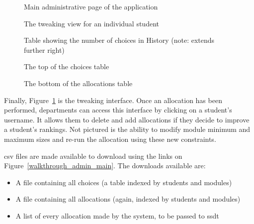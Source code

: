\begin{landscape}
  \begin{figure}
    \begin{minipage}{0.5\linewidth}
      \centering
      \caption{Main administrative page of the application}
      \label{walkthrough_admin_main}
    \end{minipage}
    \hspace{0.5cm}
    \begin{minipage}{0.5\linewidth}
      \centering
      \caption{The tweaking view for an individual student}
      \label{walkthrough_admin_view_student}
    \end{minipage}
  \end{figure}
\end{landscape}

\begin{figure}[]
  \begin{minipage}[]{0.35\linewidth}
    \centering
    \caption{Table showing the number of choices in History (note: extends further right)}
    \label{walkthrough_admin_view_all_choices}
  \end{minipage}
  \begin{minipage}[]{0.65\linewidth}
    \centering
    \caption{The top of the choices table}
    \label{walkthrough_admin_view_all_choices_visible}
    \bigskip
    \caption{The bottom of the allocations table}
    \label{walkthrough_admin_view_all_allocations_bottom}
  \end{minipage}
\end{figure}

Finally, Figure~\ref{walkthrough_admin_view_student} is the tweaking
interface. Once an allocation has been performed, departments can access this
interface by clicking on a student's username. It allows them to delete and
add allocations if they decide to improve a student's rankings. Not pictured
is the ability to modify module minimum and maximum sizes and re-run the
allocation using these new constraints.

\Gls{csv} files are made available to download using the links on
Figure~\ref{walkthrough_admin_main}. The downloads available are:

\begin{itemize}
  \item A file containing all choices (a table indexed by students and modules)
  \item A file containing all allocations (again, indexed by students and modules)
  \item A list of every allocation made by the system, to be passed to \gls{ssdt}
\end{itemize}
